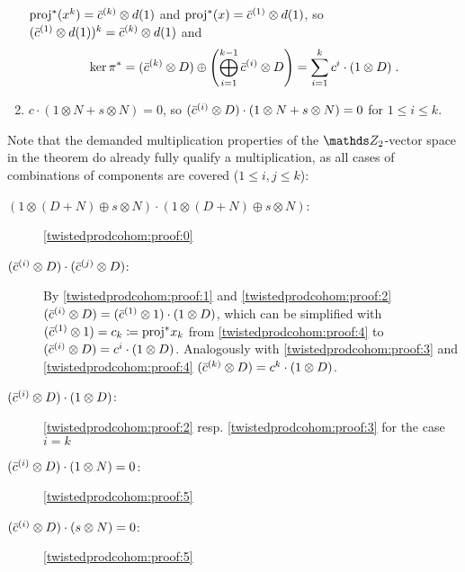 \begin{Thm}
\begin{enumerate}
    ${\mathrm{proj}}^*(x^k) = \bar c^{(k)}\otimes d(1)$ and
    ${\mathrm{proj}}^*(x) = \bar c^{(1)}\otimes d(1)$,
    so $(\bar c^{(1)}\otimes d(1))^k = \bar c^{(k)}\otimes d(1)$ and
    \begin{gather*}
      \ker{\pi}^*
      = (\bar c^{(k)}\otimes D)
      \oplus \left( \bigoplus_{i=1}^{k-1}\bar c^{(i)}\otimes D \right)
      = \sum_{i=1}^k c^i\cdot (1\otimes D)
      \;.
    \end{gather*}
  \item\label{twistedprodcohom:proof:5}
    $c\cdot (1\otimes N + s\otimes N) = 0$,
    so $(\bar c^{(i)} \otimes D)\cdot (1\otimes N + s\otimes N) = 0$
    for $1\leq i\leq k$.
  \end{enumerate}
\end{Thm}
\begin{Rem}
  Note that the demanded multiplication properties of the
  $\Zmod2$-vector space in the theorem do already fully qualify a
  multiplication, as all cases of combinations of components are
  covered ($1\leq i,j\leq k$):
  \begin{description}
  \item[$(1\otimes(D+N)\oplus s\otimes N)\cdot (1\otimes(D+N)\oplus s\otimes N)$:]
    \ref{twistedprodcohom:proof:0}
  \item[$(\bar c^{(i)}\otimes D)\cdot (\bar c^{(j)}\otimes D)$:]
    By \ref{twistedprodcohom:proof:1} and \ref{twistedprodcohom:proof:2}
    $(\bar c^{(i)}\otimes D)=(\bar c^{(1)}\otimes 1)\cdot (1\otimes D)$,
    which can be simplified with
    $(\bar c^{(1)}\otimes 1)=c_k\coloneqq {\mathrm{proj}}^* x_k$
    from \ref{twistedprodcohom:proof:4}
    to $(\bar c^{(i)}\otimes D)=c^i\cdot(1\otimes D)$.
    Analogously with \ref{twistedprodcohom:proof:3}
    and \ref{twistedprodcohom:proof:4}
    $(\bar c^{(k)}\otimes D) = c^k\cdot(1\otimes D)$.
  \item[$(\bar c^{(i)}\otimes D)\cdot (1\otimes D)$:]
    \ref{twistedprodcohom:proof:2} resp. \ref{twistedprodcohom:proof:3}
    for the case $i=k$
  \item[$(\bar c^{(i)}\otimes D)\cdot (1\otimes N) = 0$:]
    \ref{twistedprodcohom:proof:5}
  \item[$(\bar c^{(i)}\otimes D)\cdot (s\otimes N) = 0$:]
    \ref{twistedprodcohom:proof:5}
  \end{description}
\end{Rem}
